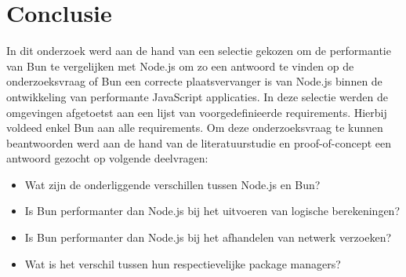 
\chapter{Conclusie}%
\label{ch:conclusie}


In dit onderzoek werd aan de hand van een selectie gekozen om de performantie van Bun te vergelijken met Node.js om zo een antwoord te vinden op de 
onderzoeksvraag of Bun een correcte plaatsvervanger is van Node.js binnen de ontwikkeling van performante JavaScript applicaties.
In deze selectie werden de omgevingen afgetoetst aan een lijst van voorgedefinieerde requirements. Hierbij voldeed enkel Bun aan alle requirements.
Om deze onderzoeksvraag te kunnen beantwoorden werd aan de hand van de literatuurstudie en proof-of-concept een antwoord gezocht op volgende deelvragen:
\begin{itemize}
    \item Wat zijn de onderliggende verschillen tussen Node.js en Bun?
    \item Is Bun performanter dan Node.js bij het uitvoeren van logische berekeningen?
    \item Is Bun performanter dan Node.js bij het afhandelen van netwerk verzoeken?
    \item Wat is het verschil tussen hun respectievelijke package managers?
  \end{itemize}

